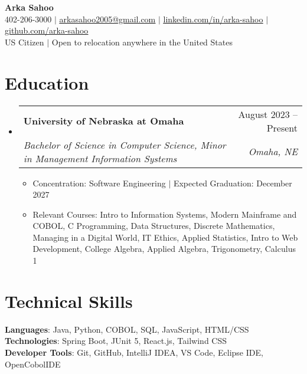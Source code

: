 \documentclass[letterpaper,11pt]{article}
\makeatletter
\newcommand{\resumeItem}[1]{
  \item\small{
    {#1 \vspace{-2pt}}
  }
}
\newcommand{\resumeSubheading}[4]{
  \vspace{-2pt}\item
    \begin{tabular*}{0.97\textwidth}[t]{l@{\extracolsep{\fill}}r}
      \textbf{#1} & #2 \\
      \textit{\small#3} & \textit{\small #4} \\
    \end{tabular*}\vspace{-7pt}
}
\newcommand{\resumeSubHeadingListStart}{\begin{itemize}[leftmargin=0.15in, label={}]}
\newcommand{\resumeSubHeadingListEnd}{\end{itemize}}
\newcommand{\resumeItemListStart}{\begin{itemize}}
\newcommand{\resumeItemListEnd}{\end{itemize}\vspace{-5pt}}
\makeatother
\begin{document}

\begin{center}
    \textbf{\Huge Arka Sahoo} \\ \vspace{1pt}
    \small 402-206-3000
    $|$
    \href{mailto:arkasahoo2005@gmail.com}{\underline{arkasahoo2005@gmail.com}}
    $|$
    \href{https://linkedin.com/in/arka-sahoo}{\underline{linkedin.com/in/arka-sahoo}} $|$
    \href{https://github.com/arka-sahoo}{\underline{github.com/arka-sahoo}} \vspace{1pt} \\
    US Citizen $|$ Open to relocation anywhere in the United States
\end{center}


\section{Education}
  \resumeSubHeadingListStart
    \resumeSubheading
      {University of Nebraska at Omaha}{August 2023 -- Present}
      {Bachelor of Science in Computer Science, Minor in Management Information Systems}{Omaha, NE}
    \resumeItemListStart
        \resumeItem{Concentration: Software Engineering $|$ Expected Graduation: December 2027}
        \resumeItem{Relevant Courses: Intro to Information Systems, Modern Mainframe and COBOL, C Programming, Data Structures, Discrete Mathematics, Managing in a Digital World, IT Ethics, Applied Statistics, Intro to Web Development, College Algebra, Applied Algebra, Trigonometry, Calculus 1}
    \resumeItemListEnd
  \resumeSubHeadingListEnd

\section{Technical Skills}
\begin{itemize}[leftmargin=0.15in, label={}]
  \small{\item{
   \textbf{Languages}{: Java, Python, COBOL, SQL, JavaScript, HTML/CSS} \\  
   \textbf{Technologies}{: Spring Boot, JUnit 5, React.js, Tailwind CSS} \\  
   \textbf{Developer Tools}{: Git, GitHub, IntelliJ IDEA, VS Code, Eclipse IDE, OpenCobolIDE} \\
  }}
\end{itemize}
\end{document}
